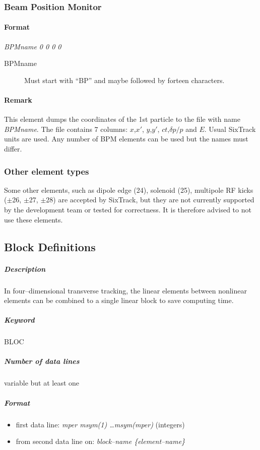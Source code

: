 \documentclass[a4paper,11pt]{report}
\begin{document}

\subsubsection{Beam Position Monitor} \label{BPM}
\paragraph{Format} {\em BPMname 0 0 0 0}
\begin{description}
\item [BPMname] Must start with ``BP'' and maybe followed by forteen characters.
\end{description}

\paragraph{Remark}
This element dumps the coordinates of the 1st particle to the file with name {\em BPMname}.
The file contains 7 columns: $x$,$x'$, $y$,$y'$, $ct$,$\delta p/p$ and $E$.
Usual SixTrack units are used. Any number of BPM elements can be used but
the names must differ. 

\subsubsection{Other element types}

Some other elements, such as dipole edge (24), solenoid (25), multipole RF kicks ($\pm$26, $\pm$27, $\pm$28) are accepted by SixTrack, but they are not currently supported by the development team or tested for correctness.
It is therefore advised to not use these elements.

\subsection{Block Definitions} \label{BloDef}

\subparagraph{Description} In four--dimensional transverse tracking,
the linear elements between nonlinear elements can be combined to a
single linear block to save computing time.

\subparagraph{Keyword} BLOC \subparagraph{Number of data lines}
variable but at least one

\subparagraph{Format}
\begin{itemize}
\item first data line: {\em mper msym(1) \dots msym(mper)}
  \/(integers)
\item from second data line on: {\em block--name \{element--name\} }
\end{itemize}
\end{document}
